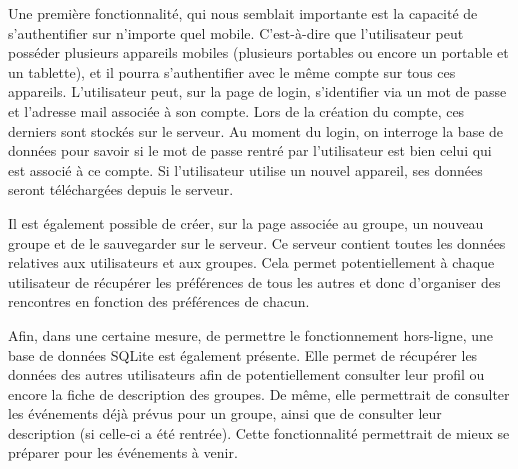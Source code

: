Une première fonctionnalité, qui nous semblait importante est la capacité de s'authentifier sur n'importe quel mobile. C'est-à-dire
que l'utilisateur peut posséder  plusieurs appareils mobiles (plusieurs portables ou encore un portable et un tablette), et il
pourra s'authentifier avec le même compte sur tous ces appareils. L'utilisateur peut, sur la page de login, s'identifier via un
mot de passe et l'adresse mail associée à son compte. Lors de la création du compte, ces derniers sont stockés sur le serveur.
Au moment du login, on interroge la base de données pour savoir si le mot de passe rentré par l'utilisateur est bien celui qui est
associé à ce compte. Si l'utilisateur utilise un nouvel appareil, ses données seront téléchargées depuis le serveur.
\newline

Il est également possible de créer, sur la page associée au groupe, un nouveau groupe et de le sauvegarder sur le serveur. Ce
serveur contient toutes les données relatives aux utilisateurs et aux groupes. Cela permet potentiellement à chaque utilisateur
de récupérer les préférences de tous les autres et donc d'organiser des rencontres en fonction des préférences de chacun.
\newline

Afin, dans une certaine mesure, de permettre le fonctionnement hors-ligne, une base de données SQLite est également présente.
Elle permet de récupérer les données des autres utilisateurs afin de potentiellement consulter leur profil ou encore la fiche de
description des groupes. De même, elle permettrait de consulter les événements déjà prévus pour un groupe, ainsi que de consulter
leur description (si celle-ci a été rentrée). Cette fonctionnalité permettrait de mieux se préparer pour les événements à venir.
\newline

